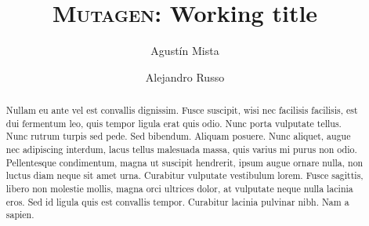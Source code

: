 \documentclass[acmsmall, anonymous]{acmart}
\newcommand{\mutagen}{\textsc{Mutagen}\xspace}
\begin{document}
\title{\mutagen: Working title}


\author{Agust\'in Mista}

\author{Alejandro Russo}





\begin{abstract}
  Nullam eu ante vel est convallis dignissim. Fusce suscipit, wisi nec facilisis
  facilisis, est dui fermentum leo, quis tempor ligula erat quis odio. Nunc
  porta vulputate tellus. Nunc rutrum turpis sed pede. Sed bibendum. Aliquam
  posuere. Nunc aliquet, augue nec adipiscing interdum, lacus tellus malesuada
  massa, quis varius mi purus non odio. Pellentesque condimentum, magna ut
  suscipit hendrerit, ipsum augue ornare nulla, non luctus diam neque sit amet
  urna. Curabitur vulputate vestibulum lorem. Fusce sagittis, libero non
  molestie mollis, magna orci ultrices dolor, at vulputate neque nulla lacinia
  eros. Sed id ligula quis est convallis tempor. Curabitur lacinia pulvinar
  nibh. Nam a sapien.
\end{abstract}


\begin{CCSXML}
\end{CCSXML}
\end{document}

